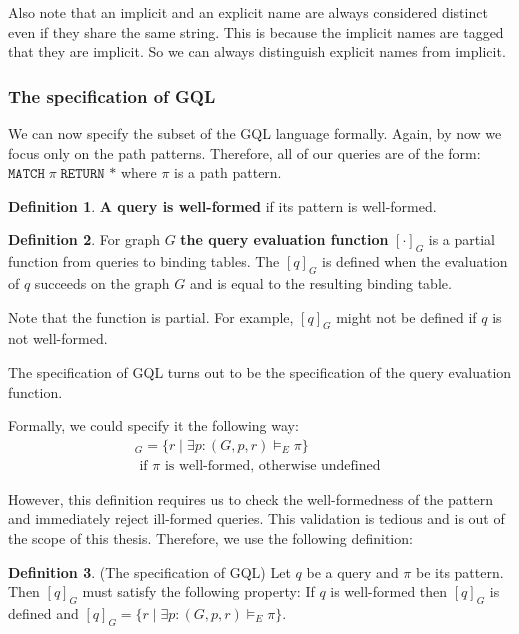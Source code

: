 \documentclass[14pt]{constructor-thesis}
\theoremstyle{definition}
\newtheorem{definition}{Definition}
\begin{document}
Also note that an implicit and an explicit name are always considered distinct even if they share the same string. This is because the implicit names are tagged that they are implicit. So we can always distinguish explicit names from implicit.

\subsubsection{The specification of GQL}

We can now specify the subset of the GQL language formally.
Again, by now we focus only on the path patterns. Therefore, all of our queries are of the form: $\texttt{MATCH} \; \pi \; \texttt{RETURN *}$ where $\pi$ is a path pattern. 

\begin{definition}
  \textbf{A query is well-formed} if its pattern is well-formed.
\end{definition}

\begin{definition}
  For graph $G$ \textbf{the query evaluation function} $[ \cdot ]_G$ is a partial function from queries to binding tables. The $[q]_G$ is defined when the evaluation of $q$ succeeds on the graph $G$ and is equal to the resulting binding table.
\end{definition}

Note that the function is partial. For example, $[q]_G$ might not be defined if $q$ is not well-formed.

The specification of GQL turns out to be the specification of the query evaluation function.

Formally, we could specify it the following way:
\begin{align*}
  [\texttt{MATCH} \; \pi \; \texttt{RETURN *}]_G = \{ r \mid \exists p : (G, p, r) \models_E \pi \} \\ \text{ if $\pi$ is well-formed, otherwise undefined }
\end{align*} 

However, this definition requires us to check the well-formedness of the pattern and immediately reject ill-formed queries. This validation is tedious and is out of the scope of this thesis. Therefore, we use the following definition:

\begin{definition}(The specification of GQL)
  \label{def:specification-of-gql}
  Let $q$ be a query and $\pi$ be its pattern. Then $[q]_G$ must satisfy the following property:
  If $q$ is well-formed then $[q]_G$ is defined and $[q]_G = \{ r \mid \exists p : (G, p, r) \models_E \pi \}$.
\end{definition}
\end{document}
